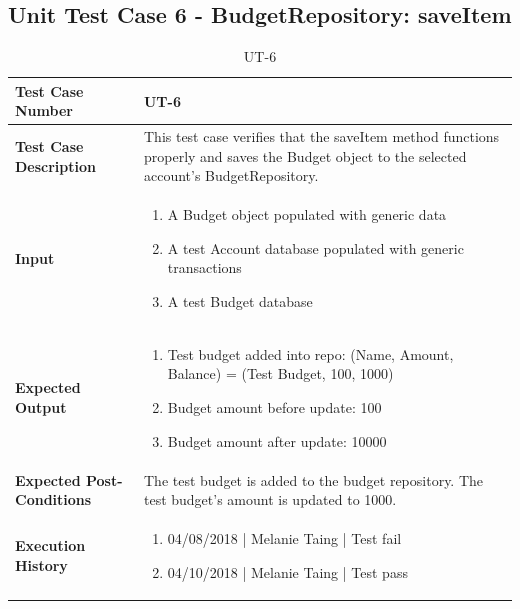 \documentclass[12pt]{article}
\begin{document}
\subsection{Unit Test Case 6 - BudgetRepository: saveItem}
\def\arraystretch{1.5}%
\begin{table}[htbp]
\centering
\caption {UT-6}
\label{UT-6}
\begin{tabularx}{\textwidth}{ | l | X |}
\hline
\textbf{Test Case Number}      &  UT-6                         \\ \hline
\textbf{Test Case Description}    &  This test case verifies that the saveItem method functions properly and saves the Budget object to the selected account's BudgetRepository.         \\ \hline
\textbf{Input}         & 	\begin{enumerate}
	\item A Budget object populated with generic data
	\item A test Account database populated with generic transactions
	\item A test Budget database
\end{enumerate} \\ \hline
\textbf{Expected Output}     & \begin{enumerate}
	\item Test budget added into repo: (Name, Amount, Balance) = (Test Budget, 100, 1000)
	\item Budget amount before update: 100
	\item Budget amount after update: 10000
\end{enumerate} \\ \hline
\textbf{Expected Post-Conditions}           & The test budget is added to the budget repository. The test budget's amount is updated to 1000.        \\ \hline
\textbf{Execution History}   &  \begin{enumerate}
	\item 04/08/2018 | Melanie Taing | Test fail
	\item 04/10/2018 | Melanie Taing | Test pass
\end {enumerate} \\ \hline
\end{tabularx}
\end{table}
\clearpage

\end{document}

